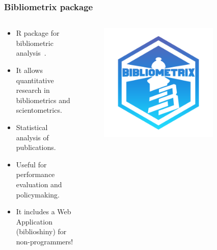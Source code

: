 \documentclass[aspectratio=169]{beamer}
\begin{document}
\begin{frame}
	\frametitle{Bibliometrix package}
	\begin{columns}
		\begin{column}{0.5\textwidth}
			\begin{itemize}
				\item R package for bibliometric analysis~\cite{aria2017}.
				\item It allows quantitative research in bibliometrics and
				      scientometrics.
				\item Statistical analysis of publications.
				\item Useful for performance evaluation and policymaking.
				\item It includes a Web Application (biblioshiny) for 
                    non-programmers!
			\end{itemize}
		\end{column}
		\begin{column}{0.5\textwidth}
			\begin{figure}
				\centering
				\includegraphics[width=0.8\textwidth]{logos/bibliometrix.png}
			\end{figure}
		\end{column}
	\end{columns}
\end{frame}
\end{document}
